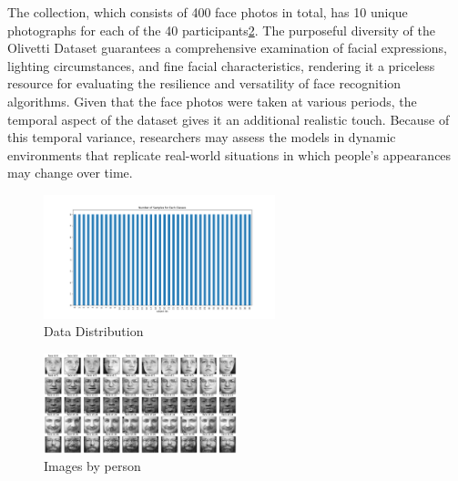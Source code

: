 \documentclass[12pt,a4paper,twocolumn]{article}
\begin{document}
The collection, which consists of 400 face photos in total, has 10 unique photographs for each of the 40 participants\ref{fig:Dataset images by person}. The purposeful diversity of the Olivetti Dataset guarantees a comprehensive examination of facial expressions, lighting circumstances, and fine facial characteristics, rendering it a priceless resource for evaluating the resilience and versatility of face recognition algorithms. Given that the face photos were taken at various periods, the temporal aspect of the dataset gives it an additional realistic touch. Because of this temporal variance, researchers may assess the models in dynamic environments that replicate real-world situations in which people's appearances may change over time.
\begin{figure}[H]
\hspace*{-1.5cm}
\includegraphics[width=0.6\textwidth]{images2/distribution.png}

\caption{\label{fig:Distribution of the Data} 
Data Distribution}
\end{figure}


\begin{figure}[H]
\centering
\includegraphics[width=0.5\textwidth]{images2/severalphotos.png}

\caption{\label{fig:Dataset images by person} 
Images by person}
\end{figure}
\end{document}
